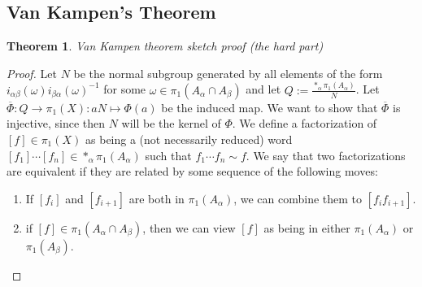 \documentclass{article}
\newtheorem{theorem}{Theorem}[section]
\begin{document}
\subsection{Van Kampen's Theorem}
\begin{theorem}
Van Kampen theorem sketch proof (the hard part)
\end{theorem}
\begin{proof}
Let $N$ be the normal subgroup generated by all elements of the form $i_{\alpha\beta}(\omega)i_{\beta\alpha}(\omega)^{-1}$ for some $\omega\in\pi_1(A_\alpha\cap A_\beta)$ and let $Q:=\frac{*_\alpha\pi_1(A_\alpha)}{N}$. Let $\overline{\Phi}:Q\to\pi_1(X):aN\mapsto\Phi(a)$ be the induced map. We want to show that $\overline{\Phi}$ is injective, since then $N$ will be the kernel of $\Phi$. We define a factorization of $[f]\in\pi_1(X)$ as being a (not necessarily reduced) word $[f_1]\cdots[f_n]\in*_\alpha\pi_1(A_\alpha)$ such that $f_1\cdots f_n\sim f$. We say that two factorizations are equivalent if they are related by some sequence of the following moves:\begin{enumerate}
    \item If $[f_i]$ and $[f_{i+1}]$ are both in $\pi_1(A_\alpha)$, we can combine them to $[f_if_{i+1}]$.
    \item if $[f]\in\pi_1(A_\alpha\cap A_\beta)$, then we can view $[f]$ as being in either $\pi_1(A_\alpha)$ or $\pi_1(A_\beta)$.

\end{enumerate}
\end{proof}
\end{document}
